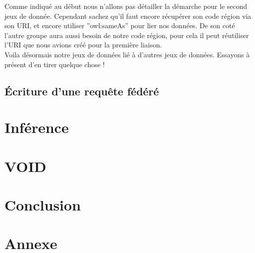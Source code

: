 \documentclass[a4paper,sffamily,12pt]{article}
\begin{document}
			\indent Comme indiqué au début nous n'allons pas détailler la démarche pour le second jeux de donnée. Cependant sachez qu'il faut encore récupérer son code région via son URI, et encore utiliser ''owl:sameAs'' pour lier nos données. De son coté l'autre groupe aura aussi besoin de notre code région, pour cela il peut réutiliser l'URI que nous avions créé pour la première liaison. \\
			
			\indent Voila désormais notre jeux de données lié à d'autres jeux de données. Essayons à présent d'en tirer quelque chose !
						
			\vspace{0.5cm}
			
		\subsection{Écriture d'une requête fédéré}
			
			\vspace{0.5cm}
			
			
			
			
			
			

			\vspace{0.5cm}			

	\section{Inférence}

		\vspace{0.5cm}
		
		




		\vspace{0.5cm}
				
	\section{VOID}

		\vspace{0.5cm}	
		
		
		
		
				
		\vspace{0.5cm}
				
	\section{Conclusion}

		\vspace{0.5cm}			



		\newpage			
		
	\section{Annexe}

		\vspace{0.5cm}
		
		
								
\end{document}
